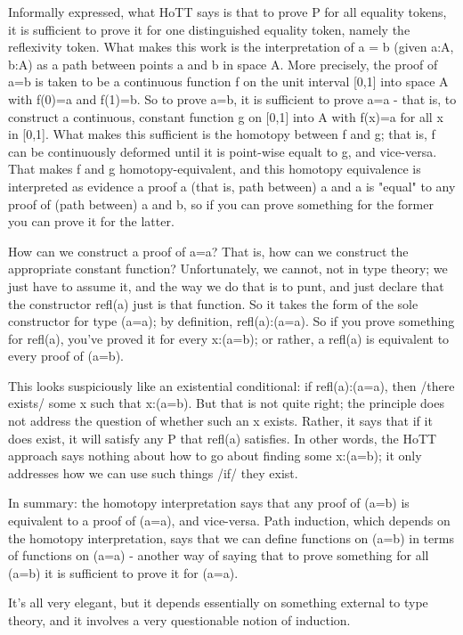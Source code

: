 \documentclass{article}
\begin{document}
Informally expressed, what HoTT says is that to prove P for all
equality tokens, it is sufficient to prove it for one distinguished
equality token, namely the reflexivity token.  What makes this work is
the interpretation of a = b (given a:A, b:A) as a path between points
a and b in space A.  More precisely, the proof of a=b is taken to be a
continuous function f on the unit interval [0,1] into space A with
f(0)=a and f(1)=b.  So to prove a=b, it is sufficient to prove a=a -
that is, to construct a continuous, constant function g on [0,1] into
A with f(x)=a for all x in [0,1].  What makes this sufficient is the
homotopy between f and g; that is, f can be continuously deformed
until it is point-wise equalt to g, and vice-versa.  That makes f and
g homotopy-equivalent, and this homotopy equivalence is interpreted as
evidence a proof a (that is, path between) a and a is "equal" to any
proof of (path between) a and b, so if you can prove something for the
former you can prove it for the latter.

How can we construct a proof of a=a?  That is, how can we construct
the appropriate constant function?  Unfortunately, we cannot, not in
type theory; we just have to assume it, and the way we do that is to
punt, and just declare that the constructor refl(a) just is that
function.  So it takes the form of the sole constructor for type
(a=a); by definition, refl(a):(a=a).  So if you prove something for
refl(a), you've proved it for every x:(a=b); or rather, a refl(a) is
equivalent to every proof of (a=b).

This looks suspiciously like an existential conditional: if
refl(a):(a=a), then /there exists/ some x such that x:(a=b).  But that
is not quite right; the principle does not address the question of
whether such an x exists.  Rather, it says that if it does exist, it
will satisfy any P that refl(a) satisfies.  In other words, the HoTT
approach says nothing about how to go about finding some x:(a=b); it
only addresses how we can use such things /if/ they exist.

In summary: the homotopy interpretation says that any proof of (a=b)
is equivalent to a proof of (a=a), and vice-versa.  Path induction,
which depends on the homotopy interpretation, says that we can define
functions on (a=b) in terms of functions on (a=a) - another way of
saying that to prove something for all (a=b) it is sufficient to prove
it for (a=a).

It's all very elegant, but it depends essentially on something
external to type theory, and it involves a very questionable notion of
induction.
\end{document}
